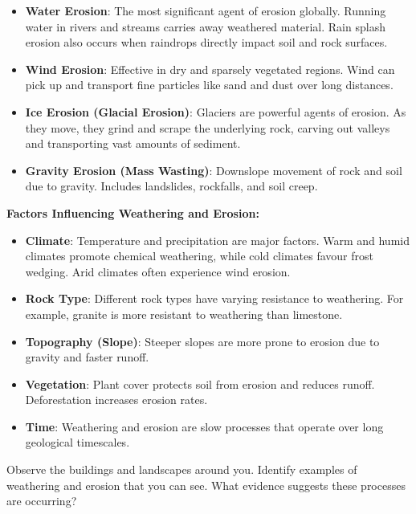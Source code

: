 \begin{itemize}
    \item \textbf{Water Erosion}:  The most significant agent of erosion globally.  Running water in rivers and streams carries away weathered material.  Rain splash erosion also occurs when raindrops directly impact soil and rock surfaces.
    \item \textbf{Wind Erosion}:  Effective in dry and sparsely vegetated regions. Wind can pick up and transport fine particles like sand and dust over long distances.
    \item \textbf{Ice Erosion (Glacial Erosion)}:  Glaciers are powerful agents of erosion.  As they move, they grind and scrape the underlying rock, carving out valleys and transporting vast amounts of sediment.
    \item \textbf{Gravity Erosion (Mass Wasting)}:  Downslope movement of rock and soil due to gravity.  Includes landslides, rockfalls, and soil creep.
\end{itemize}

\textbf{Factors Influencing Weathering and Erosion:}

\begin{itemize}
    \item \textbf{Climate}: Temperature and precipitation are major factors.  Warm and humid climates promote chemical weathering, while cold climates favour frost wedging.  Arid climates often experience wind erosion.
    \item \textbf{Rock Type}:  Different rock types have varying resistance to weathering.  For example, granite is more resistant to weathering than limestone.
    \item \textbf{Topography (Slope)}:  Steeper slopes are more prone to erosion due to gravity and faster runoff.
    \item \textbf{Vegetation}: Plant cover protects soil from erosion and reduces runoff.  Deforestation increases erosion rates.
    \item \textbf{Time}:  Weathering and erosion are slow processes that operate over long geological timescales.
\end{itemize}

\begin{stopandthink}
Observe the buildings and landscapes around you.  Identify examples of weathering and erosion that you can see.  What evidence suggests these processes are occurring?
\end{stopandthink}

